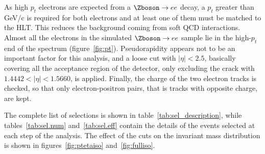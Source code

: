      As high $p_t$ electrons are expected from a $\Zboson\rightarrow ee$ decay, a $p_t$ greater than \unit[15]{GeV/c} is required for both electrons and at least one of them must be matched to the HLT. This reduces the background coming from soft QCD interactions. Almost all the electrons in the simulated $\Zboson\rightarrow ee$ sample lie in the high-$p_t$ end of the spectrum (figure~\ref{fig:pt}).
     Pseudorapidity appears not to be an important factor for this analysis, and a loose cut with $\lvert \eta \rvert < 2.5$, basically covering all the acceptance region of the detector, only excluding the crack with $1.4442 < \lvert \eta \rvert < 1.5660$, is applied. Finally, the charge of the two electron tracks is checked, so that only electron-positron pairs, that is tracks with opposite charge, are kept.

     The complete list of selections is shown in table~\ref{tab:sel_description}, while tables~\ref{tab:sel.num} and~\ref{tab:sel.eff} contain the details of the events selected at each step of the analysis. The effect of the cuts on the invariant mass distribution is shown in figures~\ref{fig:ptetaiso} and~\ref{fig:fulliso}.
\begin{table}[htbp]
    
\end{table}
\begin{table}[htbp]
    
\end{table}
